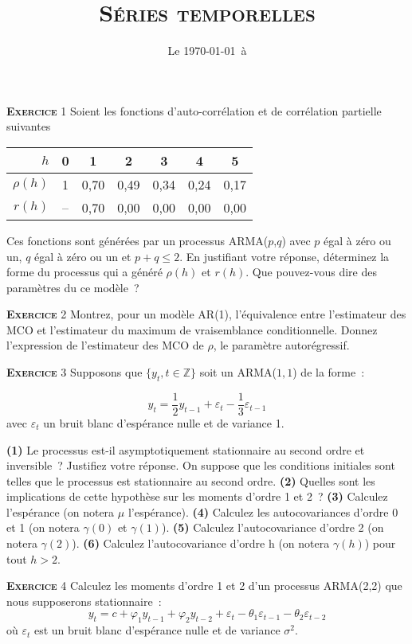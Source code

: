 \documentclass[10pt,a4paper,notitlepage,onecolumn]{article}
\newcommand{\exercice}[1]{\textsc{\textbf{Exercice}} #1}
\newcommand{\question}[1]{\textbf{(#1)}}
\begin{document}
\title{\textsc{Séries temporelles}}
\date{Le \today\ à \thistime}


\maketitle

\exercice{1} Soient les fonctions d'auto-corrélation et de corrélation
partielle suivantes
\begin{table}[H]
  \centering
  \begin{tabular}{r|cccccc}
    \hline\hline
    $h$ & 0 & 1 & 2 & 3 & 4 & 5 \\\hline
    $\rho (h)$ & 1 & 0,70 & 0,49 & 0,34 & 0,24 & 0,17\\
    $r (h)$ & -- & 0,70 & 0,00 & 0,00 & 0,00 & 0,00\\
    \hline\hline
  \end{tabular}
\end{table}
\noindent Ces  fonctions sont générées par  un processus ARMA($p$,$q$)
avec $p$ égal à zéro ou un, $q$ égal  à zéro ou un et $p+q \leq 2$. En
justifiant  votre réponse,  déterminez  la forme  du  processus qui  a
généré $\rho(h)$ et $r(h)$. Que  pouvez-vous dire des paramètres du ce
modèle~?

\bigskip
\bigskip


\exercice{2}  Montrez,  pour  un  modèle  AR(1),  l'équivalence  entre
l'estimateur  des  MCO et  l'estimateur  du  maximum de  vraisemblance
conditionnelle. Donnez l'expression de l'estimateur des MCO de $\rho$,
le paramètre autorégressif.

\bigskip
\bigskip

\exercice{3} Supposons que $\{y_t,t\in\mathbb Z\}$ soit un ARMA($1,1$) de la forme :

\[
y_t = \frac{1}{2}y_{t-1} + \varepsilon_t - \frac{1}{3} \varepsilon_{t-1}
\]
avec $\varepsilon_t$ un bruit blanc d'espérance nulle et de variance 1.\newline

\question{1}   Le    processus   est-il   asymptotiquement
stationnaire  au   second  ordre   et  inversible~?   Justifiez  votre
réponse. On suppose  que les conditions initiales sont  telles que le
processus est stationnaire au second ordre. \question{2} Quelles sont les implications de cette hypothèse sur les moments d'ordre 1 et 2 ? \question{3} Calculez l'espérance (on notera $\mu$ l'espérance). \question{4} Calculez les autocovariances d'ordre 0 et 1 (on notera $\gamma(0)$ et $\gamma(1)$). \question{5} Calculez l'autocovariance d'ordre 2 (on notera $\gamma(2)$). \question{6} Calculez l'autocovariance d'ordre h (on notera $\gamma(h)$) pour tout $h>2$.

\bigskip
\bigskip

\exercice{4} Calculez les moments d'ordre 1 et 2 d'un processus ARMA(2,2) que nous supposerons stationnaire :
\[
y_t = c + \varphi_1 y_{t-1} + \varphi_2 y_{t-2} + \varepsilon_t - \theta_1 \varepsilon_{t-1} - \theta_2 \varepsilon_{t-2}
\]
où $\varepsilon_t$ est un bruit blanc d'espérance nulle et de variance $\sigma^2$. 
\end{document}
